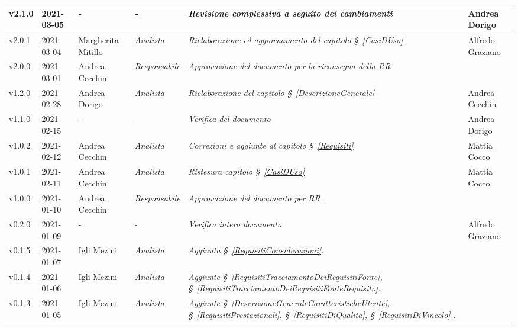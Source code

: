 {\begin{center}
\begin{longtable}[c]{|p{2cm-1\tabcolsep}|p{2cm}|p{3cm-2\tabcolsep}|p{}|p{4cm-2\tabcolsep}|p{}|}
		\hline
		\centering v2.1.0 & 2021-03-05 &\centering - & \centering \textit{-} &  \textit{Revisione complessiva a seguito dei cambiamenti}  & Andrea Dorigo\\
		\hline
		\centering v2.0.1 & 2021-03-04 & Margherita Mitillo & \centering \textit{Analista} &\textit{Rielaborazione ed aggiornamento del capitolo \S~\ref{CasiDUso}} & Alfredo Graziano  \\
		\hline
		\centering v2.0.0 & 2021-03-01 & Andrea Cecchin & \centering \textit{Responsabile} &\textit{Approvazione del documento per la riconsegna della RR} &  \makecell[c]{-}\\
		\hline
		\centering v1.2.0 & 2021-02-28 & Andrea Dorigo & \centering \textit{Analista} &\textit{Rielaborazione del capitolo \S~\ref{DescrizioneGenerale}} & Andrea Cecchin  \\
		\hline
		\centering v1.1.0 & 2021-02-15 & \centering - & \centering - &\textit{Verifica del documento} & Andrea Dorigo  \\
		\hline
		\centering v1.0.2 & 2021-02-12 & Andrea Cecchin & \centering \textit{Analista} &\textit{Correzioni e aggiunte al capitolo \S~\ref{Requisiti}} & Mattia Cocco  \\
		\hline
		\centering v1.0.1 & 2021-02-11 & Andrea Cecchin & \centering \textit{Analista} &\textit{Ristesura capitolo \S~\ref{CasiDUso}} & Mattia Cocco  \\
		\hline
		\centering v1.0.0 & 2021-01-10 & Andrea Cecchin & \centering \textit{Responsabile} &\textit{Approvazione del documento per RR.} &  \makecell[c]{-}  \\
		\hline
		\centering v0.2.0 & 2021-01-09 & \centering - & \centering - &\textit{Verifica intero documento.} & Alfredo Graziano  \\
		\hline
		\centering v0.1.5 & 2021-01-07 & Igli Mezini & \centering \textit{Analista} & \textit{Aggiunta  \S~\ref{RequisitiConsiderazioni}.} & \makecell[c]{-}  \\
		\hline
		\centering v0.1.4 & 2021-01-06 & Igli Mezini & \centering \textit{Analista} & \textit{Aggiunte \S~\ref{RequisitiTracciamentoDeiRequisitiFonte}, \S~\ref{RequisitiTracciamentoDeiRequisitiFonteRequisito}.} &   \makecell[c]{-}  \\
		\hline
		\centering v0.1.3 & 2021-01-05 & Igli Mezini & \centering \textit{Analista} & \textit{Aggiunte \S~\ref{DescrizioneGeneraleCaratteristicheUtente}, \S~\ref{RequisitiPrestazionali}, \S~\ref{RequisitiDiQualita}, \S~\ref{RequisitiDiVincolo} .} &  \makecell[c]{-}  \\

\end{longtable}
\end{center}}

